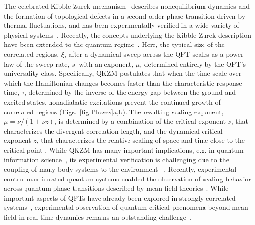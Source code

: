 \documentclass[prl,nobalancelastpage,superscriptaddress,twocolumn,nofootinbib]{revtex4}
\begin{document}
The celebrated Kibble-Zurek mechanism~\cite{Kibble1976,Zurek1985} describes nonequilibrium dynamics and the formation of topological defects in a second-order phase transition driven by thermal fluctuations, and has been experimentally verified in a wide variety of physical systems~\cite{delCampo2014,
Navon2015}. Recently, the concepts underlying the Kibble-Zurek description have been extended to the quantum regime~\cite{Polkovnikov2005, Zurek2005, Dziarmaga2005}. Here, the typical size of the correlated regions, $\xi$, after a dynamical sweep across the QPT scales as a power-law of the sweep rate, $s$, with an exponent, $\mu$, determined entirely by the QPT's universality class. Specifically, QKZM  postulates that when the time scale over which the Hamiltonian changes becomes faster than the characteristic response time,  $\tau$, determined by the inverse of the energy gap between the ground and excited states, nonadiabatic excitations prevent the continued growth of  correlated regions (Figs.~\ref{fig:Phases}a,b). The resulting scaling exponent, $\mu = \nu /(1+\nu z)$, is determined by a combination of the critical exponent $\nu$, that characterizes the divergent correlation length, and the dynamical critical exponent $z$, that characterizes the relative scaling of space and time close to the critical point \cite{Sachdev2009}.  While QKZM 
has many important implications, e.g. in 
quantum information science~\cite{Farhi2000}, 
its experimental verification 
is challenging 
due to the coupling of many-body systems to the environment
~\cite{Gardas2018}. Recently, experimental control over isolated quantum systems enabled the observation of scaling behavior across quantum phase transitions described by mean-field theories~\cite{Anquez2016,Clark2016}. While important aspects of QPTs have already been explored in strongly correlated systems~\cite{Endres2012}, experimental observation of quantum critical phenomena beyond mean-field in real-time dynamics remains an outstanding challenge~\cite{Chen2011,Braun2015,Gardas2018}.
\end{document}
